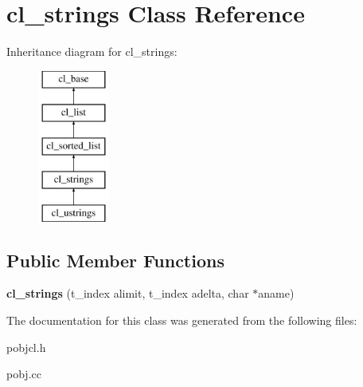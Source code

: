 \hypertarget{classcl__strings}{
\section{cl\_\-strings Class Reference}
\label{classcl__strings}
}
Inheritance diagram for cl\_\-strings:\begin{figure}[H]
\begin{center}
\leavevmode
\includegraphics[height=5.000000cm]{classcl__strings}
\end{center}
\end{figure}
\subsection*{Public Member Functions}
\begin{DoxyCompactItemize}
\item 
\hypertarget{classcl__strings_ab64f40558c0308ee24800c1b0a7f7a13}{
{\bfseries cl\_\-strings} (t\_\-index alimit, t\_\-index adelta, char $\ast$aname)}
\label{classcl__strings_ab64f40558c0308ee24800c1b0a7f7a13}

\end{DoxyCompactItemize}


The documentation for this class was generated from the following files:\begin{DoxyCompactItemize}
\item 
pobjcl.h\item 
pobj.cc\end{DoxyCompactItemize}
